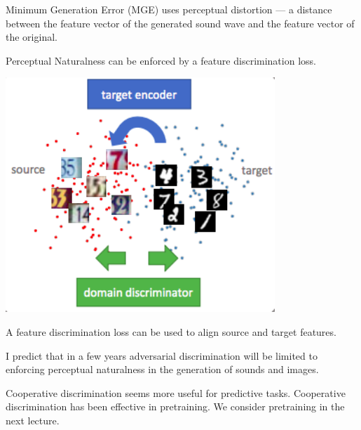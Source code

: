 {\vfill
Minimum Generation Error (MGE) uses {\color{red} perceptual distortion} ---
a distance between the feature vector of the generated sound wave and the
feature vector of the original.

\vfill
{\color{red}Perceptual Naturalness} can be enforced by a feature discrimination loss.


\centerline{\includegraphics[width = 4.0in]{../images/AdvDomainAdapt}}

A feature discrimination loss can be used to align source and target features.


\vfill
I predict that in a few years adversarial discrimination will be limited to enforcing perceptual naturalness in the generation of sounds and images.

\vfill
Cooperative discrimination seems more useful for predictive tasks.  Cooperative discrimination has been effective in pretraining.
We consider pretraining in the next lecture.

}

